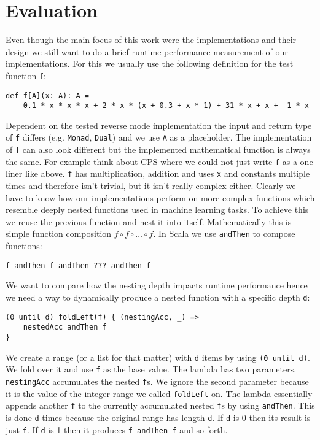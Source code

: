 \chapter{Evaluation}\label{sec:evaluation}

Even though the main focus of this work were the implementations and their design we still want to do a brief runtime performance measurement of our implementations. For this we usually use the following definition for the test function \lstinline{f}:
\begin{lstlisting}
def f[A](x: A): A =
    0.1 * x * x * x + 2 * x * (x + 0.3 + x * 1) + 31 * x + x + -1 * x
\end{lstlisting}
Dependent on the tested reverse mode implementation the input and return type of \lstinline{f} differs (e.g. \lstinline{Monad}, \lstinline{Dual}) and we use \lstinline{A} as a placeholder. The implementation of \lstinline{f} can also look different but the implemented mathematical function is always the same. For example think about CPS where we could not just write \lstinline{f} as a one liner like above.
\lstinline{f} has multiplication, addition and uses \lstinline{x} and constants multiple times and therefore isn't trivial, but it isn't really complex either. Clearly we have to know how our implementations perform on more complex functions which resemble deeply nested functions used in machine learning tasks. To achieve this we reuse the previous function and nest it into itself. Mathematically this is simple function composition
$f \circ f \circ \dots \circ f$. In Scala we use \lstinline{andThen} to compose functions:
\begin{lstlisting}
f andThen f andThen ??? andThen f
\end{lstlisting}
We want to compare how the nesting depth impacts runtime performance hence we need a way to dynamically produce a nested function with a specific depth \lstinline{d}:
\begin{lstlisting}
(0 until d) foldLeft(f) { (nestingAcc, _) =>
    nestedAcc andThen f
}
\end{lstlisting}
We create a range (or a list for that matter) with \lstinline{d} items by using \lstinline{(0 until d)}. We fold over it and use \lstinline{f} as the base value. The lambda has two parameters. \lstinline{nestingAcc} accumulates the nested \lstinline{f}s. We ignore the second parameter because it is the value of the integer range we called \lstinline{foldLeft} on. The lambda essentially appends another \lstinline{f} to the currently accumulated nested \lstinline{f}s by using \lstinline{andThen}. This is done \lstinline{d} times because the original range has length \lstinline{d}. If \lstinline{d} is 0 then its result is just \lstinline{f}. If \lstinline{d} is 1 then it produces \lstinline{f andThen f} and so forth.

